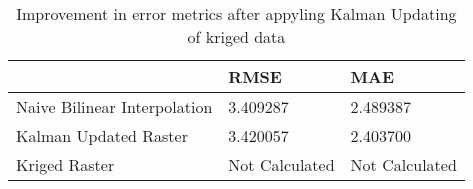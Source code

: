 \begin{table}
\caption{Improvement in error metrics after appyling Kalman Updating of kriged data}
\label{tab:Oahu5_lidar_error}
\begin{tabular}{lll}
\toprule
 & RMSE & MAE \\
\midrule
Naive Bilinear Interpolation & 3.409287 & 2.489387 \\
Kalman Updated Raster & 3.420057 & 2.403700 \\
Kriged Raster & Not Calculated & Not Calculated \\
\bottomrule
\end{tabular}
\end{table}
